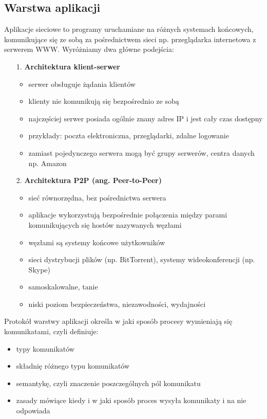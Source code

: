 \subsection{Warstwa aplikacji}
Aplikacje sieciowe to programy uruchamiane na różnych systemach końcowych, komunikujące się ze sobą za pośrednictwem sieci np. przeglądarka internetowa z serwerem WWW. Wyróżniamy dwa główne podejścia:
\begin{enumerate}
    \item[1.] \textbf{Architektura klient-serwer}
        \begin{itemize}
            \item serwer obsługuje żądania klientów
            \item klienty nie komunikują się bezpośrednio ze sobą
            \item najczęściej serwer posiada ogólnie znany adres IP i jest cały czas dostępny
            \item przykłady: poczta elektroniczna, przeglądarki, zdalne logowanie
            \item zamiast pojedynczego serwera mogą być grupy serwerów, centra danych np. Amazon
        \end{itemize}
    \item[2.] \textbf{Architektura P2P (ang. Peer-to-Peer)}
        \begin{itemize}
            \item sieć równorzędna, bez pośrednictwa serwera
            \item aplikacje wykorzystują bezpośrednie połączenia między parami komunikujących się hostów nazywanych węzłami
            \item węzłami są systemy końcowe użytkowników
            \item sieci dystrybucji plików (np. BitTorrent), systemy wideokonferencji (np. Skype)
            \item samoskalowalne, tanie
            \item niski poziom bezpieczeństwa, niezawodności, wydajności
        \end{itemize}
\end{enumerate}

Protokół warstwy aplikacji określa w jaki sposób procesy wymieniają się komunikatami, czyli definiuje:
\begin{itemize}
    \item typy komunikatów
    \item składnię różnego typu komunikatów
    \item semantykę, czyli znaczenie poszczególnych pól komunikatu
    \item zasady mówiące kiedy i w jaki sposób proces wysyła komunikaty i na nie odpowiada
\end{itemize}

